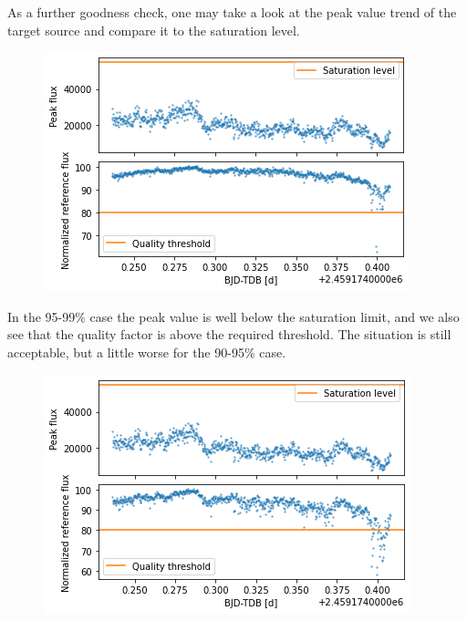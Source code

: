 \documentclass[a4paper,11pt,twocolumn]{article}
\begin{document}
As a further goodness check, one may take a look at the peak value trend of 
the target source and compare it to the saturation level.
\begin{figure}[H]
    \centering  
    \includegraphics[scale=0.5, angle=0]{../pictures/taste/saturation-quality.png}
\end{figure}
In the 95-99\% case the peak value is well below the saturation limit, and we also see that the 
quality factor is above the required threshold. The situation is still 
acceptable, but a little worse for the 90-95\% case.
\begin{figure}[H]
    \centering  
    \includegraphics[scale=0.5, angle=0]{../pictures/taste/saturation-quality2.png}
\end{figure}
\end{document}
